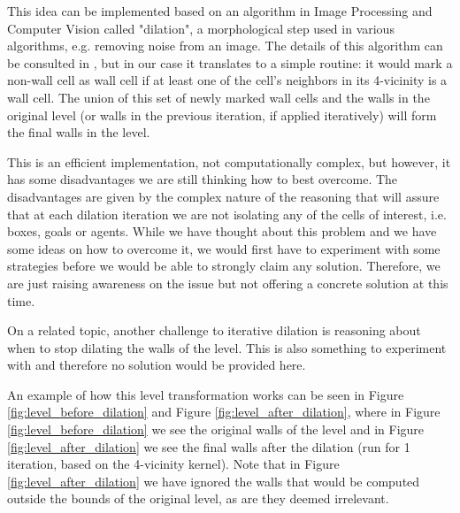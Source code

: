 \documentclass[letterpaper]{article}
\begin{document}
This idea can be implemented based on an algorithm in Image Processing and Computer Vision called "dilation", a morphological step used in various algorithms, e.g. removing noise from an image. The details of this algorithm can be consulted in \cite{dilation}, but in our case it translates to a simple routine: it would mark a non-wall cell as wall cell if at least one of the cell's neighbors in its 4-vicinity is a wall cell. The union of this set of newly marked wall cells and the walls in the original level (or walls in the previous iteration, if applied iteratively) will form the final walls in the level.

This is an efficient implementation, not computationally complex, but however, it has some disadvantages we are still thinking how to best overcome. The disadvantages are given by the complex nature of the reasoning that will assure that at each dilation iteration we are not isolating any of the cells of interest, i.e. boxes, goals or agents. While we have thought about this problem and we have some ideas on how to overcome it, we would first have to experiment with some strategies before we would be able to strongly claim any solution. Therefore, we are just raising awareness on the issue but not offering a concrete solution at this time.

On a related topic, another challenge to iterative dilation is reasoning about when to stop dilating the walls of the level. This is also something to experiment with and therefore no solution would be provided here.

An example of how this level transformation works can be seen in Figure \ref{fig:level_before_dilation} and Figure \ref{fig:level_after_dilation}, where in Figure \ref{fig:level_before_dilation} we see the original walls of the level and in Figure \ref{fig:level_after_dilation} we see the final walls after the dilation (run for 1 iteration, based on the 4-vicinity kernel). Note that in Figure \ref{fig:level_after_dilation} we have ignored the walls that would be computed outside the bounds of the original level, as are they deemed irrelevant.
\end{document}

